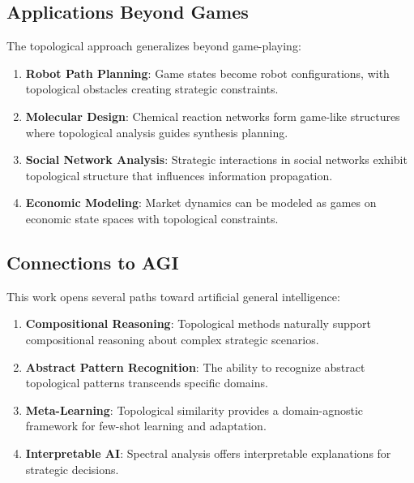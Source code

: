 \documentclass{article}
\begin{document}
\subsection{Applications Beyond Games}

The topological approach generalizes beyond game-playing:

\begin{enumerate}
\item \textbf{Robot Path Planning}: Game states become robot configurations, with topological obstacles creating strategic constraints.

\item \textbf{Molecular Design}: Chemical reaction networks form game-like structures where topological analysis guides synthesis planning.

\item \textbf{Social Network Analysis}: Strategic interactions in social networks exhibit topological structure that influences information propagation.

\item \textbf{Economic Modeling}: Market dynamics can be modeled as games on economic state spaces with topological constraints.
\end{enumerate}

\subsection{Connections to AGI}

This work opens several paths toward artificial general intelligence:

\begin{enumerate}
\item \textbf{Compositional Reasoning}: Topological methods naturally support compositional reasoning about complex strategic scenarios.

\item \textbf{Abstract Pattern Recognition}: The ability to recognize abstract topological patterns transcends specific domains.

\item \textbf{Meta-Learning}: Topological similarity provides a domain-agnostic framework for few-shot learning and adaptation.

\item \textbf{Interpretable AI}: Spectral analysis offers interpretable explanations for strategic decisions.
\end{enumerate}
\end{document}
